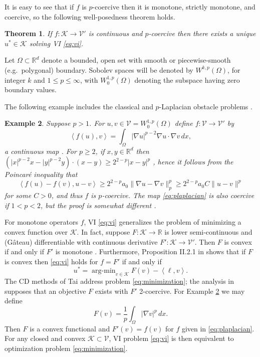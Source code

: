 \documentclass[letterpaper,final,12pt,reqno]{amsart}
\theoremstyle{cstyle}
\newtheorem{theorem}{Theorem}
\theoremstyle{cstyle*}
\theoremstyle{dstyle}
\newtheorem{example}[theorem]{Example}
\numberwithin{equation}{section}
\numberwithin{figure}{section}
\numberwithin{table}{section}
\numberwithin{theorem}{section}
\newcommand{\RR}{\mathbb{R}}
\newcommand{\grad}{\nabla}
\newcommand{\cK}{\mathcal{K}}
\newcommand{\cV}{\mathcal{V}}
\newcommand{\ip}[2]{\left<#1,#2\right>}
\begin{document}
It is easy to see that if $f$ is $p$-coercive then it is monotone, strictly monotone, and coercive, so the following well-posedness theorem holds.

\begin{theorem}  \label{thm:viwellposed}  If $f:\cK \to \cV'$ is continuous and $p$-coercive then there exists a unique $u^*\in \cK$ solving VI \eqref{eq:vi}.
\end{theorem}

Let $\Omega \subset \RR^d$ denote a bounded, open set with smooth or piecewise-smooth (e.g.~polygonal) boundary.  Sobolev spaces \cite{Evans2010} will be denoted by $W^{k,p}(\Omega)$, for integer $k$ and $1\le p \le \infty$, with $W^{1,p}_0(\Omega)$ denoting the subspace having zero boundary values.

The following example includes the classical and $p$-Laplacian obstacle problems \cite{ChoeLewis1991}.

\begin{example}  \label{ex:plaplacian}  Suppose $p>1$.  For $u,v \in \cV = W^{1,p}_0(\Omega)$ define $f:\cV \to \cV'$ by
\begin{equation}
\ip{f(u)}{v} = \int_\Omega |\grad u|^{p-2} \grad u \cdot \grad v\,dx, \label{eq:plaplacian}
\end{equation}
a continuous map \cite[Theorem A.0.6]{Peral1997}.  For $p\ge 2$, if $x,y\in\RR^d$ then $(|x|^{p-2} x - |y|^{p-2} y)\cdot (x-y) \ge 2^{2-p} |x-y|^p$ \cite[Appendix A]{Bueler2021conservation}, hence it follows from the Poincar\'e inequality that
    $$\ip{f(u) - f(v)}{u-v} \ge 2^{2-p} a_0 \|\grad u - \grad v\|_p^p \ge 2^{2-p} a_0 C \|u-v\|^p$$
for some $C>0$, and thus $f$ is $p$-coercive.  The map \eqref{eq:plaplacian} is also coercive if $1<p<2$, but the proof is somewhat different \cite[Theorem 4.4, for example]{Bueler2021conservation}.  \end{example}

For monotone operators $f$, VI \eqref{eq:vi} generalizes the problem of minimizing a convex function over $\cK$.  In fact, suppose $F:\cK \to \RR$ is lower semi-continuous and (G\^ateau) differentiable with continuous derivative $F':\cK \to \cV'$.  Then $F$ is convex if and only if $F'$ is monotone \cite[Proposition I.5.5]{EkelandTemam1976}.  Furthermore, Proposition II.2.1 in \cite{EkelandTemam1976} shows that if $F$ is convex then \eqref{eq:vi} holds for $f=F'$ if and only if
\begin{equation}
u^* = \operatorname{arg-min}_{v\in\cK} F(v) - \ip{\ell}{v}. \label{eq:minimization}
\end{equation}
The CD methods of Tai \cite{Tai2003} address problem \eqref{eq:minimization}; the analysis in \cite{Tai2003} supposes that an objective $F$ exists with $F'$ 2-coercive.  For Example \ref{ex:plaplacian} we may define
\begin{equation}
F(v) = \frac{1}{p} \int_\Omega |\grad v|^p\,dx. \label{eq:plaplacianobjective}
\end{equation}
Then $F$ is a convex functional and $F'(v) = f(v)$ for $f$ given in \eqref{eq:plaplacian}.  For any closed and convex $\cK\subset \cV$, VI problem \eqref{eq:vi} is then equivalent to optimization problem \eqref{eq:minimization}.
\end{document}
